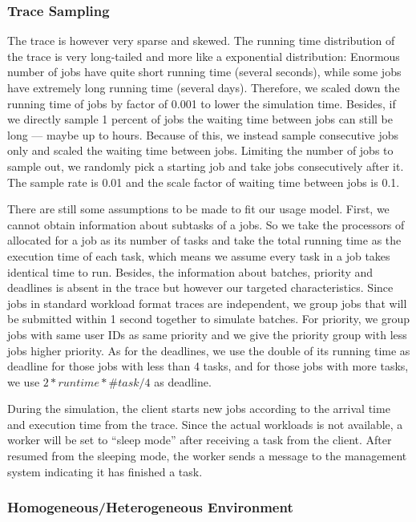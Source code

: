 \subsubsection{Trace Sampling}

The trace is however very sparse and skewed.
The running time distribution of the trace is very long-tailed and more
like a exponential distribution: Enormous number of jobs have quite
short running time (several seconds), while some jobs have extremely
long running time (several days).
Therefore, we scaled down the running time of jobs by factor of 0.001 to
lower the simulation time.
Besides, if we directly sample 1 percent of jobs the waiting time
between jobs can still be long --- maybe up to hours.
Because of this, we instead sample consecutive jobs only and scaled the
waiting time between jobs.
Limiting the number of jobs to sample out, we randomly pick a starting
job and take jobs consecutively after it.
The sample rate is 0.01 and the scale factor of waiting time between
jobs is 0.1.

There are still some assumptions to be made to fit our usage model.
First, we cannot obtain information about subtasks of a jobs.
So we take the processors of allocated for a job as its number of tasks
and take the total running time as the execution time of each task,
which means we assume every task in a job takes identical time to run.
Besides, the information about batches, priority and deadlines is absent
in the trace but however our targeted characteristics.
Since jobs in standard workload format traces are independent, we group
jobs that will be submitted within 1 second together to simulate
batches.
For priority, we group jobs with same user IDs as same priority and we
give the priority group with less jobs higher priority.
As for the deadlines, we use the double of its running time as deadline
for those jobs with less than 4 tasks, and for those jobs with more
tasks, we use $2 * runtime * \#task / 4$ as deadline.

During the simulation, the client starts new jobs according to the
arrival time and execution time from the trace.
Since the actual workloads is not available, a worker will be set to
``sleep mode'' after receiving a task from the client.
After resumed from the sleeping mode, the worker sends a message to the
management system indicating it has finished a task.

\subsubsection{Homogeneous/Heterogeneous Environment}

